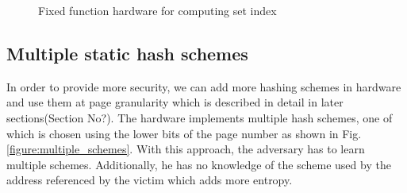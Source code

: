 \begin{figure}
  \caption{Fixed function hardware for computing set index}
  \label{figure:fixed_func_hw}
\end{figure}

\subsection{Multiple static hash schemes}
In order to provide more security, we can add more hashing schemes in hardware and use them at page granularity which is described in detail in later sections(Section No?). The hardware implements multiple hash schemes, one of which is chosen using the lower bits of the page number as shown in Fig. \ref{figure:multiple_schemes}. With this approach, the adversary has to learn multiple schemes. Additionally, he has no knowledge of the scheme used by the address referenced by the victim which adds more entropy.

